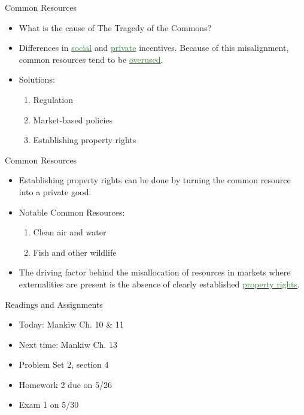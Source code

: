 \documentclass[xcolor={dvipsnames},pdf, hyperref={colorlinks=true, citecolor=ForestGreen, linkcolor=BlueViolet, urlcolor=Magenta}]{beamer}
\newcommand{\dd}[1]{{\underline{\textcolor{ForestGreen}{#1}}}}
\begin{document}
\begin{frame}{Common Resources}
\begin{itemize}
	\item What is the cause of The Tragedy of the Commons? 
	\item Differences in \dd{social} and \dd{private} incentives. Because of this misalignment, common resources tend to be \dd{overused}.
	\item Solutions:
	\begin{enumerate}
		\item Regulation
		\item Market-based policies
		\item Establishing property rights
	\end{enumerate}
\end{itemize}
\end{frame}

\begin{frame}{Common Resources}
\begin{itemize}
	\item Establishing property rights can be done by turning the common resource into a private good. 
	\item Notable Common Resources:
	\begin{enumerate}
		\item Clean air and water
		\item Fish and other wildlife
	\end{enumerate}
	\item The driving factor behind the misallocation of resources in markets where externalities are present is the absence of clearly established \dd{property rights}.
\end{itemize}
\end{frame}


\begin{frame}{Readings and Assignments}
\begin{itemize}
	\item Today: Mankiw Ch. 10 \& 11
	\item Next time: Mankiw Ch. 13
	\item Problem Set 2, section 4
	\item Homework 2 due on 5/26
	\item Exam 1 on 5/30
\end{itemize}
\end{frame}
\end{document}
